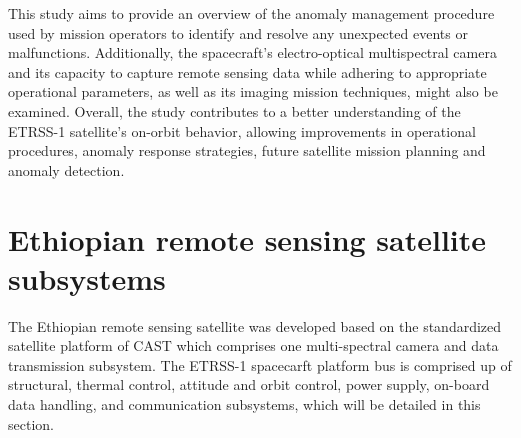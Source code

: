 \documentclass[final,5p,times,twocolumn]{elsarticle}
\begin{document}
\begin{table}[ht]
	\small
	\caption{Orbital parameters of ETRSS-1} %
	\centering %
	\label{table:nonlin} %
\end{table}
This study aims to provide an overview of the anomaly management procedure used by mission operators to identify and resolve any unexpected events or malfunctions.  Additionally, the spacecraft's electro-optical multispectral camera and its capacity to capture remote sensing data while adhering to appropriate operational parameters, as well as its imaging mission techniques, might also be examined. Overall, the study contributes to a better understanding of the ETRSS-1 satellite's on-orbit behavior, allowing improvements in operational procedures, anomaly response strategies,  future satellite mission planning and anomaly detection.
\section{Ethiopian remote sensing satellite subsystems}
The Ethiopian remote sensing satellite was developed based on the standardized satellite platform of CAST \cite{zhu2007cast, zhang2007first} which comprises one multi-spectral camera and data transmission subsystem. The ETRSS-1 spacecarft platform bus is comprised up of structural, thermal control, attitude and orbit control, power supply, on-board data handling, and communication subsystems, which will be detailed in this section.
\end{document}
